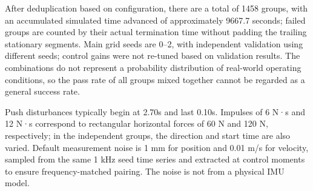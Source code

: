 After deduplication based on configuration, there are a total of 1458 groups, with an accumulated simulated time advanced of approximately 9667.7 seconds; failed groups are counted by their actual termination time without padding the trailing stationary segments. Main grid seeds are 0--2, with independent validation using different seeds; control gains were not re-tuned based on validation results. The combinations do not represent a probability distribution of real-world operating conditions, so the pass rate of all groups mixed together cannot be regarded as a general success rate.

Push disturbances typically begin at 2.70s and last 0.10s. Impulses of 6 N·s and 12 N·s correspond to rectangular horizontal forces of 60 N and 120 N, respectively; in the independent groups, the direction and start time are also varied. Default measurement noise is 1 mm for position and 0.01 m/s for velocity, sampled from the same 1 kHz seed time series and extracted at control moments to ensure frequency-matched pairing. The noise is not from a physical IMU model.

